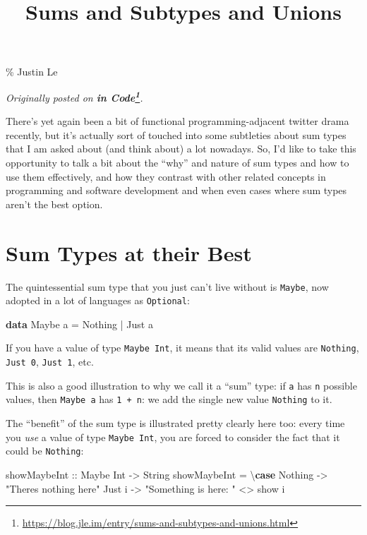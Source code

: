 \documentclass[]{article}
\title{Sums and Subtypes and Unions}
\newenvironment{Shaded}{}{}
\newcommand{\DataTypeTok}[1]{\textcolor[rgb]{0.56,0.13,0.00}{#1}}
\newcommand{\FunctionTok}[1]{\textcolor[rgb]{0.02,0.16,0.49}{#1}}
\newcommand{\KeywordTok}[1]{\textcolor[rgb]{0.00,0.44,0.13}{\textbf{#1}}}
\newcommand{\NormalTok}[1]{#1}
\newcommand{\OperatorTok}[1]{\textcolor[rgb]{0.40,0.40,0.40}{#1}}
\newcommand{\OtherTok}[1]{\textcolor[rgb]{0.00,0.44,0.13}{#1}}
\newcommand{\StringTok}[1]{\textcolor[rgb]{0.25,0.44,0.63}{#1}}
\renewcommand{\href}[2]{#2\footnote{\url{#1}}}
\begin{document}
\maketitle

\% Justin Le

\emph{Originally posted on
\textbf{\href{https://blog.jle.im/entry/sums-and-subtypes-and-unions.html}{in
Code}}.}

There's yet again been a bit of functional programming-adjacent twitter drama
recently, but it's actually sort of touched into some subtleties about sum types
that I am asked about (and think about) a lot nowadays. So, I'd like to take
this opportunity to talk a bit about the ``why'' and nature of sum types and how
to use them effectively, and how they contrast with other related concepts in
programming and software development and when even cases where sum types aren't
the best option.

\section{Sum Types at their Best}\label{sum-types-at-their-best}

The quintessential sum type that you just can't live without is \texttt{Maybe},
now adopted in a lot of languages as \texttt{Optional}:

\begin{Shaded}
\begin{Highlighting}[]
\KeywordTok{data} \DataTypeTok{Maybe}\NormalTok{ a }\OtherTok{=} \DataTypeTok{Nothing} \OperatorTok{|} \DataTypeTok{Just}\NormalTok{ a}
\end{Highlighting}
\end{Shaded}

If you have a value of type \texttt{Maybe\ Int}, it means that its valid values
are \texttt{Nothing}, \texttt{Just\ 0}, \texttt{Just\ 1}, etc.

This is also a good illustration to why we call it a ``sum'' type: if \texttt{a}
has \texttt{n} possible values, then \texttt{Maybe\ a} has \texttt{1\ +\ n}: we
add the single new value \texttt{Nothing} to it.

The ``benefit'' of the sum type is illustrated pretty clearly here too: every
time you \emph{use} a value of type \texttt{Maybe\ Int}, you are forced to
consider the fact that it could be \texttt{Nothing}:

\begin{Shaded}
\begin{Highlighting}[]
\OtherTok{showMaybeInt ::} \DataTypeTok{Maybe} \DataTypeTok{Int} \OtherTok{{-}\textgreater{}} \DataTypeTok{String}
\NormalTok{showMaybeInt }\OtherTok{=}\NormalTok{ \textbackslash{}}\KeywordTok{case}
  \DataTypeTok{Nothing} \OtherTok{{-}\textgreater{}} \StringTok{"There\textquotesingle{}s nothing here"}
  \DataTypeTok{Just}\NormalTok{ i }\OtherTok{{-}\textgreater{}} \StringTok{"Something is here: "} \OperatorTok{\textless{}\textgreater{}} \FunctionTok{show}\NormalTok{ i}
\end{Highlighting}
\end{Shaded}
\end{document}
